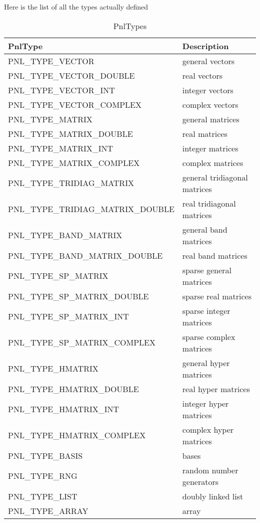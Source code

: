 Here is the list of all the types actually defined
\begin{table}
  \centering
  \begin{tabular}{l|l}
    \hline
    PnlType & Description \\
    \hline
    PNL_TYPE_VECTOR & general vectors  \\
    PNL_TYPE_VECTOR_DOUBLE & real vectors \\
    PNL_TYPE_VECTOR_INT & integer vectors \\
    PNL_TYPE_VECTOR_COMPLEX & complex vectors \\
    PNL_TYPE_MATRIX & general matrices  \\
    PNL_TYPE_MATRIX_DOUBLE & real matrices \\
    PNL_TYPE_MATRIX_INT & integer matrices \\
    PNL_TYPE_MATRIX_COMPLEX & complex matrices \\
    PNL_TYPE_TRIDIAG_MATRIX & general tridiagonal matrices \\
    PNL_TYPE_TRIDIAG_MATRIX_DOUBLE & real  tridiagonal matrices \\
    PNL_TYPE_BAND_MATRIX & general band matrices \\
    PNL_TYPE_BAND_MATRIX_DOUBLE & real band matrices \\
    PNL_TYPE_SP_MATRIX & sparse general matrices  \\
    PNL_TYPE_SP_MATRIX_DOUBLE & sparse real matrices \\
    PNL_TYPE_SP_MATRIX_INT & sparse integer matrices \\
    PNL_TYPE_SP_MATRIX_COMPLEX & sparse complex matrices \\
    PNL_TYPE_HMATRIX & general hyper matrices \\
    PNL_TYPE_HMATRIX_DOUBLE & real hyper matrices \\
    PNL_TYPE_HMATRIX_INT & integer hyper matrices \\
    PNL_TYPE_HMATRIX_COMPLEX & complex hyper matrices \\
    PNL_TYPE_BASIS & bases \\
    PNL_TYPE_RNG & random number generators \\
    PNL_TYPE_LIST & doubly linked list \\
    PNL_TYPE_ARRAY & array
  \end{tabular}
  \caption{PnlTypes}
  \label{types}
\end{table}

